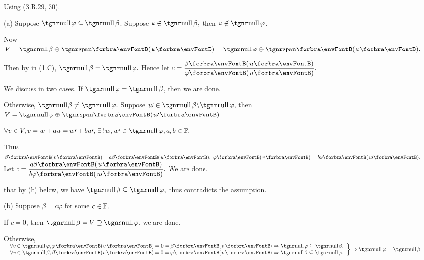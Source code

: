 \documentclass[a4paper, 11pt, UTF8]{article}
\begin{document}
\begin{large}
\par\quad
Using (3.B.29, 30).\par\quad
(a) Suppose $\null \varphi \subseteq\null\beta$. Suppose $u\not\in\null\beta,$ then $u\not\in\null\varphi$.\par\quad\Ha
Now $V=\null\beta\oplus\Span{u}=\null\varphi\oplus\Span{u}.$\vspace{3pt}\par\quad\Ha
Then by \TIPS in (1.C), $\null\beta=\null\varphi.$ Hence let $c=\displaystyle\frac{\beta\Par{u}}{\varphi\Par{u}}.$\vspace{8pt}\par\quad\Ha
\Or We discuss in two cases. If $\null\varphi=\null\beta$, then we are done.\par\quad\Ha
Otherwise, $\null\beta\neq\null\varphi.$ Suppose $u\apostrophe\in\null\beta\backslash\null\varphi,$ then $V=\null\varphi \oplus\Span{u\apostrophe}.$\par\quad\Ha
$\forall v \in V, v=w+au=w\apostrophe+bu\apostrophe,\,\exists\,!\,w, w\apostrophe\in\null\varphi,a, b\in\Fbb.$\vspace{3pt}\par\quad\Ha
Thus $\beta\Par{v}=a\beta\Par{u},\,\,\varphi\Par{v} = b\varphi\Par{u\apostrophe}.$ Let $c=\displaystyle\frac{a\beta\Par{u}}{b\varphi\Par{u\apostrophe}}.$ We are done.\vspace{3pt}\par\quad\Ha
\NOTICE that by (b) below, we have $\null\beta\subseteq\null\varphi,$ thus contradicts the assumption.\vspace{4pt}\par\quad
(b) Suppose $\beta=c\varphi$ for some $c\in{\mathbb{F}}.$\par\quad\Hb
If $c=0$, then $\null \beta=V\supseteq\null\varphi$, we are done.\vspace{2pt}\par\quad\Hb
Otherwise,$\MathRightBrace{r}{$
	$\forall v\in\null\varphi,\varphi\Par{v}=0=\beta\Par{v} \Rightarrow\null\varphi\subseteq\null\beta.\\
	\forall v \in\null\beta,\beta\Par{v}=0=\varphi\Par{v}\Rightarrow\null \beta\subseteq\null\varphi.}\Rightarrow\null\varphi=\null\beta$

\end{large}
\end{document}
